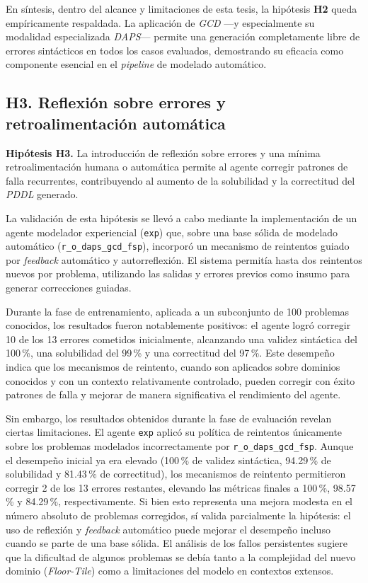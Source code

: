 En síntesis, dentro del alcance y limitaciones de esta tesis, la hipótesis \textbf{H2} queda empíricamente respaldada. La aplicación de \textit{GCD} —y especialmente su modalidad especializada \textit{DAPS}— permite una generación completamente libre de errores sintácticos en todos los casos evaluados, demostrando su eficacia como componente esencial en el \textit{pipeline} de modelado automático.

\subsection*{H3. Reflexión sobre errores y retroalimentación automática}

\textbf{Hipótesis H3.} La introducción de reflexión sobre errores y una mínima retroalimentación humana o automática permite al agente corregir patrones de falla recurrentes, contribuyendo al aumento de la solubilidad y la correctitud del \textit{PDDL} generado.

La validación de esta hipótesis se llevó a cabo mediante la implementación de un agente modelador experiencial (\texttt{exp}) que, sobre una base sólida de modelado automático (\texttt{r\_o\_daps\_gcd\_fsp}), incorporó un mecanismo de reintentos guiado por \textit{feedback} automático y autorreflexión. El sistema permitía hasta dos reintentos nuevos por problema, utilizando las salidas y errores previos como insumo para generar correcciones guiadas.

Durante la fase de entrenamiento, aplicada a un subconjunto de 100 problemas conocidos, los resultados fueron notablemente positivos: el agente logró corregir 10 de los 13 errores cometidos inicialmente, alcanzando una validez sintáctica del 100\,\%, una solubilidad del 99\,\% y una correctitud del 97\,\%. Este desempeño indica que los mecanismos de reintento, cuando son aplicados sobre dominios conocidos y con un contexto relativamente controlado, pueden corregir con éxito patrones de falla y mejorar de manera significativa el rendimiento del agente.

Sin embargo, los resultados obtenidos durante la fase de evaluación revelan ciertas limitaciones. El agente \texttt{exp} aplicó su política de reintentos únicamente sobre los problemas modelados incorrectamente por \texttt{r\_o\_daps\_gcd\_fsp}. Aunque el desempeño inicial ya era elevado (100\,\% de validez sintáctica, 94.29\,\% de solubilidad y 81.43\,\% de correctitud), los mecanismos de reintento permitieron corregir 2 de los 13 errores restantes, elevando las métricas finales a 100\,\%, 98.57\,\% y 84.29\,\%, respectivamente. Si bien esto representa una mejora modesta en el número absoluto de problemas corregidos, sí valida parcialmente la hipótesis: el uso de reflexión y \textit{feedback} automático puede mejorar el desempeño incluso cuando se parte de una base sólida. El análisis de los fallos persistentes sugiere que la dificultad de algunos problemas se debía tanto a la complejidad del nuevo dominio (\textit{Floor-Tile}) como a limitaciones del modelo en contextos extensos.

